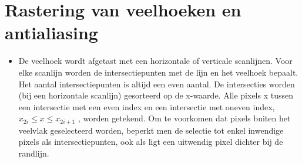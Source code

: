 \documentclass{report}
\begin{document}
\section{Rastering van veelhoeken en antialiasing}
\begin{enumerate}
	{
		\begin{itemize}
			\item De veelhoek wordt afgetast met een horizontale of verticale scanlijnen. Voor elke scanlijn worden de intersectiepunten met de lijn en het veelhoek bepaalt. Het aantal intersectiepunten is altijd een even aantal. De intersecties worden (bij een horizontale scanlijn) gesorteerd op de x-waarde. Alle pixels x tussen een intersectie met een even index en een intersectie met oneven index, $x_{2i} \leq x \leq x_{2i + 1}$ , worden getekend. Om te voorkomen dat pixels buiten het veelvlak geselecteerd worden, beperkt men de selectie tot enkel inwendige pixels als intersectiepunten, ook als ligt een uitwendig pixel dichter bij de randlijn. 
		\end{itemize}
	}
			

\end{enumerate}
\end{document}
